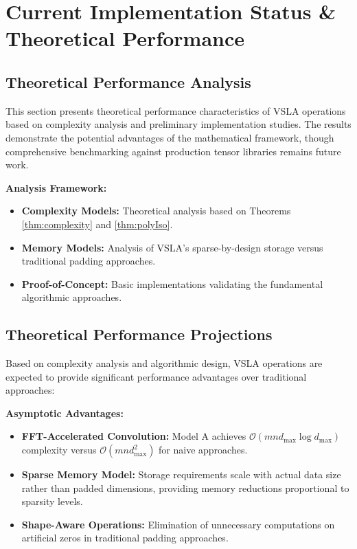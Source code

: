 \section{Current Implementation Status \& Theoretical Performance}
\label{sec:evaluation}

\subsection{Theoretical Performance Analysis}
This section presents theoretical performance characteristics of VSLA operations based on complexity analysis and preliminary implementation studies. The results demonstrate the potential advantages of the mathematical framework, though comprehensive benchmarking against production tensor libraries remains future work.

\textbf{Analysis Framework:}
\begin{itemize}[leftmargin=1.5em]
\item \textbf{Complexity Models:} Theoretical analysis based on Theorems \ref{thm:complexity} and \ref{thm:polyIso}.
\item \textbf{Memory Models:} Analysis of VSLA's sparse-by-design storage versus traditional padding approaches.
\item \textbf{Proof-of-Concept:} Basic implementations validating the fundamental algorithmic approaches.
\end{itemize}

\subsection{Theoretical Performance Projections}

Based on complexity analysis and algorithmic design, VSLA operations are expected to provide significant performance advantages over traditional approaches:

\textbf{Asymptotic Advantages:}
\begin{itemize}[leftmargin=1.5em]
\item \textbf{FFT-Accelerated Convolution:} Model A achieves $\mathcal{O}(mn d_{\max} \log d_{\max})$ complexity versus $\mathcal{O}(mn d_{\max}^2)$ for naive approaches.
\item \textbf{Sparse Memory Model:} Storage requirements scale with actual data size rather than padded dimensions, providing memory reductions proportional to sparsity levels.
\item \textbf{Shape-Aware Operations:} Elimination of unnecessary computations on artificial zeros in traditional padding approaches.
\end{itemize}


